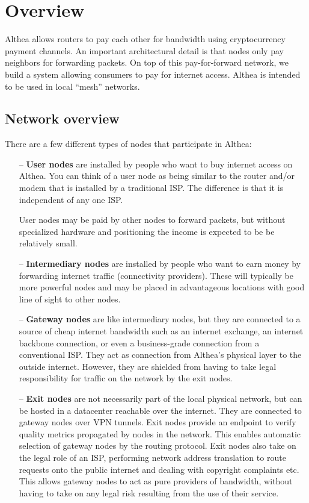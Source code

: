 \documentclass[11pt]{article}
\begin{document}
\tableofcontents

\section{Overview}
\label{sec:overview}
Althea allows routers to pay each other for bandwidth using cryptocurrency payment channels. An important architectural detail is that nodes only pay neighbors for forwarding packets. On top of this pay-for-forward network, we build a system allowing consumers to pay for internet access. Althea is intended to be used in local ``mesh'' \cite{wcn} networks.

\subsection{Network overview}

There are a few different types of nodes that participate in Althea:

\begin{itemize}
\item[--] \textbf{User nodes} are installed by people who want to buy internet access on Althea. You can think of a user node as being similar to the router and/or modem that is installed by a traditional ISP. The difference is that it is independent of any one ISP.
 
User nodes may be paid by other nodes to forward packets, but without specialized hardware and positioning the income is expected to be be relatively small.

\item[--] \textbf{Intermediary nodes} are installed by people who want to earn money by forwarding internet traffic (connectivity providers). These will typically be more powerful nodes and may be placed in advantageous locations with good line of sight to other nodes. 

\item[--] \textbf{Gateway nodes} are like intermediary nodes, but they are connected to a source of cheap internet bandwidth such as an internet exchange, an internet backbone connection, or even a business-grade connection from a conventional ISP. They act as connection from Althea’s physical layer to the outside internet. However, they are shielded from having to take legal responsibility for traffic on the network by the exit nodes.

\item[--] \textbf{Exit nodes} are not necessarily part of the local physical network, but can be hosted in a datacenter reachable over the internet. They are connected to gateway nodes over VPN tunnels. Exit nodes provide an endpoint to verify quality metrics propagated by nodes in the network. This enables automatic selection of gateway nodes by the routing protocol. Exit nodes also take on the legal role of an ISP, performing network address translation to route requests onto the public internet and dealing with copyright complaints etc. This allows gateway nodes to act as pure providers of bandwidth, without having to take on any legal risk resulting from the use of their service.

\end{itemize}
\end{document}
